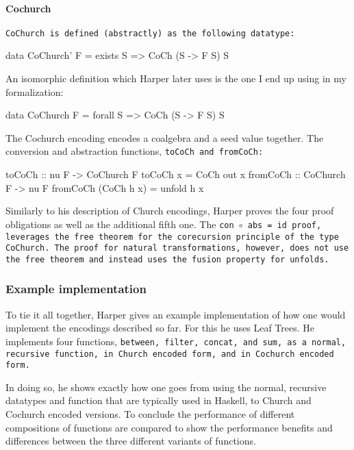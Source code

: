 \paragraph{Cochurch} \tt{CoChurch} is defined (abstractly) as the following datatype:
\begin{code}
data CoChurch' F = exists S => CoCh (S -> F S) S
\end{code}
An isomorphic definition which Harper later uses is the one I end up using in my formalization:
\begin{code}
data CoChurch F = forall S => CoCh (S -> F S) S
\end{code}
The Cochurch encoding encodes a coalgebra and a seed value together.
The conversion and abstraction functions, \tt{toCoCh} and \tt{fromCoCh}:
\begin{code}
toCoCh :: nu F -> CoChurch F
toCoCh x = CoCh out x
fromCoCh :: CoChurch F -> nu F
fromCoCh (CoCh h x) = unfold h x  
\end{code}
Similarly to his description of Church encodings, Harper proves the four proof obligations as well as the additional fifth one.
The \tt{con $\circ$ abs = id} proof, leverages the free theorem for the corecursion principle of the type \tt{CoChurch}.
The proof for natural transformations, however, does not use the free theorem and instead uses the fusion property for unfolds.

\subsubsection{Example implementation}
To tie it all together, Harper gives an example implementation of how one would implement the encodings described so far.
For this he uses Leaf Trees.
He implements four functions, \tt{between}, \tt{filter}, \tt{concat}, and \tt{sum}, as a normal, recursive function, in Church encoded form, and in Cochurch encoded form.

In doing so, he shows exactly how one goes from using the normal, recursive datatypes and function that are typically used in Haskell, to Church and Cochurch encoded versions.
To conclude the performance of different compositions of functions are compared to show the performance benefits and differences between the three different variants of functions.

\iffalse
\begin{itemize}
    \Item 
\end{itemize}
\fi
